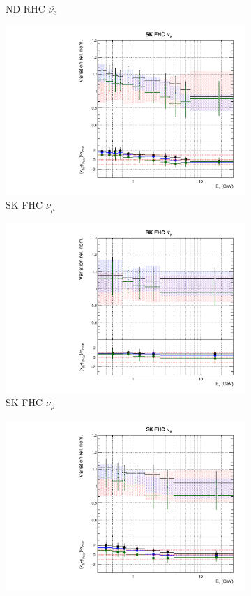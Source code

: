 \begin{figure}
\begin{subfigure}{0.24\textwidth}
  \caption{ND RHC $\bar{\nu_e}$}
\end{subfigure}
\begin{subfigure}{0.24\textwidth}
  \centering
  \includegraphics[width=0.95\linewidth]{figs/fhcrhcfitsflux_8}
  \caption{SK FHC $\nu_{\mu}$}
\end{subfigure}
\begin{subfigure}{0.24\textwidth}
  \centering
  \includegraphics[width=0.95\linewidth]{figs/fhcrhcfitsflux_9}
  \caption{SK FHC $\bar{\nu_{\mu}}$}
\end{subfigure}
\begin{subfigure}{0.24\textwidth}
  \centering
  \includegraphics[width=0.95\linewidth]{figs/fhcrhcfitsflux_10}

\end{subfigure}
\end{figure}
